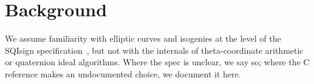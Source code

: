 \section{Background}
\label{sec:background}

We assume familiarity with elliptic curves and isogenies at the level
of the SQIsign specification~\cite{sqisign-spec-v2.0.1}, but not with the
internals of theta-coordinate arithmetic or quaternion ideal algorithms.
Where the spec is unclear, we say so; where the C reference makes an
undocumented choice, we document it here.
